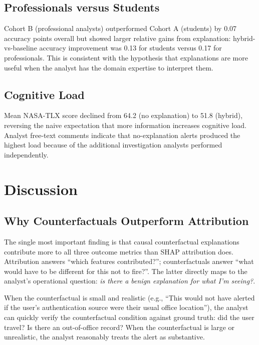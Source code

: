 \documentclass[sigconf,nonacm]{acmart}
\begin{document}
\subsection{Professionals versus Students}

Cohort B (professional analysts) outperformed Cohort A (students) by 0.07
accuracy points overall but showed larger relative gains from explanation:
hybrid-vs-baseline accuracy improvement was 0.13 for students versus 0.17
for professionals. This is consistent with the hypothesis that explanations
are more useful when the analyst has the domain expertise to interpret
them.

\subsection{Cognitive Load}

Mean NASA-TLX score declined from 64.2 (no explanation) to 51.8 (hybrid),
reversing the naive expectation that more information increases cognitive
load. Analyst free-text comments indicate that no-explanation alerts
produced the highest load because of the additional investigation analysts
performed independently.

\section{Discussion}
\label{sec:discussion}

\subsection{Why Counterfactuals Outperform Attribution}

The single most important finding is that causal counterfactual
explanations contribute more to all three outcome metrics than SHAP
attribution does. Attribution answers ``which features contributed?'';
counterfactuals answer ``what would have to be different for this not to
fire?''. The latter directly maps to the analyst's operational question:
\emph{is there a benign explanation for what I'm seeing?}.

When the counterfactual is small and realistic (e.g., ``This would not
have alerted if the user's authentication source were their usual office
location''), the analyst can quickly verify the counterfactual condition
against ground truth: did the user travel? Is there an out-of-office
record? When the counterfactual is large or unrealistic, the analyst
reasonably treats the alert as substantive.
\end{document}
